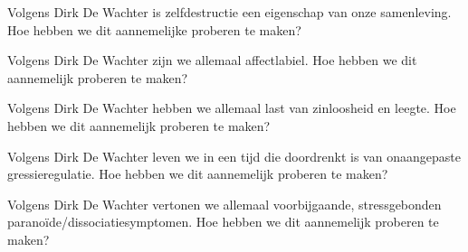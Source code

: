 \documentclass[main.tex]{subfiles}
\begin{document}
\begin{examenvraag}
    \begin{vraag}
        Volgens Dirk De Wachter is zelfdestructie een eigenschap van onze samenleving. Hoe hebben we dit aannemelijke proberen te maken?
    \end{vraag}

    \begin{antwoord}
    \end{antwoord}
\end{examenvraag}


\begin{examenvraag}
    \begin{vraag}
        Volgens Dirk De Wachter zijn we allemaal affectlabiel. Hoe hebben we dit aannemelijk proberen te maken?
    \end{vraag}

    \begin{antwoord}
    \end{antwoord}
\end{examenvraag}


\begin{examenvraag}
    \begin{vraag}
        Volgens Dirk De Wachter hebben we allemaal last van zinloosheid en leegte. Hoe hebben we dit aannemelijk proberen te maken?
    \end{vraag}

    \begin{antwoord}
    \end{antwoord}
\end{examenvraag}


\begin{examenvraag}
    \begin{vraag}
        Volgens Dirk De Wachter leven we in een tijd die doordrenkt is van onaangepaste gressieregulatie. Hoe hebben we dit aannemelijk proberen te maken?
    \end{vraag}

    \begin{antwoord}
    \end{antwoord}
\end{examenvraag}


\begin{examenvraag}
    \begin{vraag}
        Volgens Dirk De Wachter vertonen we allemaal voorbijgaande, stressgebonden paranoïde/dissociatiesymptomen. Hoe hebben we dit aannemelijk proberen te maken?
    \end{vraag}

    \begin{antwoord}
    \end{antwoord}
\end{examenvraag}
\end{document}
